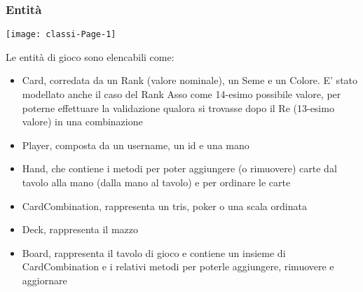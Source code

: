 \subsubsection{Entità}
\begin{center}
    \texttt{[image: classi-Page-1]}
\end{center}
Le entità di gioco sono elencabili come:
\begin{itemize}
    \item Card, corredata da un Rank (valore nominale), un Seme e un Colore.
    E’ stato modellato anche il caso del Rank Asso come 14-esimo possibile valore, per poterne effettuare la validazione qualora si trovasse dopo il Re (13-esimo valore) in una combinazione
    \item Player, composta da un username, un id e una mano
    \item Hand, che contiene i metodi per poter aggiungere (o rimuovere) carte dal tavolo alla mano (dalla mano al tavolo) e per ordinare le carte
    \item CardCombination, rappresenta un tris, poker o una scala ordinata
    \item Deck, rappresenta il mazzo
    \item Board, rappresenta il tavolo di gioco e contiene un insieme di CardCombination e i relativi metodi per poterle aggiungere, rimuovere e aggiornare
\end{itemize}

